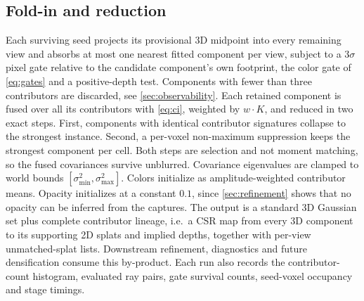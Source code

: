 \subsection{Fold-in and reduction}
\label{sec:reduction}

Each surviving seed projects its provisional 3D midpoint into every remaining view and
absorbs at most one nearest fitted component per view, subject to a $3\sigma$ pixel gate
relative to the candidate component's own footprint, the color gate of \cref{eq:gates}
and a positive-depth test.  Components with fewer than three contributors are discarded,
see \cref{sec:observability}.  Each retained component is fused over all its contributors
with \cref{eq:ci}, weighted by $w \cdot K$, and reduced in two exact steps.  First,
components with identical contributor signatures collapse to the strongest instance.
Second, a per-voxel non-maximum suppression keeps the strongest component per cell.  Both
steps are selection and not moment matching, so the fused covariances survive unblurred.
Covariance eigenvalues are clamped to world bounds $[\sigma_{\min}^2, \sigma_{\max}^2]$.
Colors initialize as amplitude-weighted contributor means.  Opacity initializes at a
constant $0.1$, since \cref{sec:refinement} shows that no opacity can be inferred from
the captures.  The output is a standard 3D Gaussian set plus complete contributor
lineage, i.e.\ a CSR map from every 3D component to its supporting 2D splats and implied
depths, together with per-view unmatched-splat lists.  Downstream refinement, diagnostics
and future densification consume this by-product.  Each run also records the
contributor-count histogram, evaluated ray pairs, gate survival counts, seed-voxel
occupancy and stage timings.

\begin{figure}[t]
  \centering
  \caption{}
  \label{fig:beam-geometry}
\end{figure}

